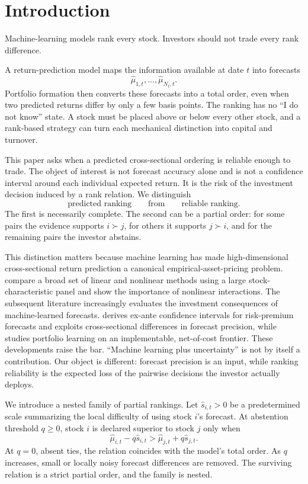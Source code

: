 \section{Introduction}

Machine-learning models rank every stock. Investors should not trade every rank difference.

A return-prediction model maps the information available at date $t$ into forecasts
\[
\widehat\mu_{1,t},\ldots,\widehat\mu_{N_t,t}.
\]
Portfolio formation then converts these forecasts into a total order, even when two predicted returns differ by only a few basis points. The ranking has no ``I do not know'' state. A stock must be placed above or below every other stock, and a rank-based strategy can turn each mechanical distinction into capital and turnover.

This paper asks when a predicted cross-sectional ordering is reliable enough to trade. The object of interest is not forecast accuracy alone and is not a confidence interval around each individual expected return. It is the risk of the investment decision induced by a rank relation. We distinguish
\[
\text{predicted ranking}
\qquad\text{from}\qquad
\text{reliable ranking}.
\]
The first is necessarily complete. The second can be a partial order: for some pairs the evidence supports $i\succ j$, for others it supports $j\succ i$, and for the remaining pairs the investor abstains.

This distinction matters because machine learning has made high-dimensional cross-sectional return prediction a canonical empirical-asset-pricing problem. \citet{GuKellyXiu2020} compare a broad set of linear and nonlinear methods using a large stock-characteristic panel and show the importance of nonlinear interactions. The subsequent literature increasingly evaluates the investment consequences of machine-learned forecasts. \citet{Allena2026} derives ex-ante confidence intervals for risk-premium forecasts and exploits cross-sectional differences in forecast precision, while \citet{JensenKellyMalamudPedersen2026} studies portfolio learning on an implementable, net-of-cost frontier. These developments raise the bar. ``Machine learning plus uncertainty'' is not by itself a contribution. Our object is different: forecast precision is an input, while ranking reliability is the expected loss of the pairwise decisions the investor actually deploys.

We introduce a nested family of partial rankings. Let $\widehat s_{i,t}>0$ be a predetermined scale summarizing the local difficulty of using stock $i$'s forecast. At abstention threshold $q\geq0$, stock $i$ is declared superior to stock $j$ only when
\[
\widehat\mu_{i,t}-q\widehat s_{i,t}
>
\widehat\mu_{j,t}+q\widehat s_{j,t}.
\]
At $q=0$, absent ties, the relation coincides with the model's total order. As $q$ increases, small or locally noisy forecast differences are removed. The surviving relation is a strict partial order, and the family is nested.

